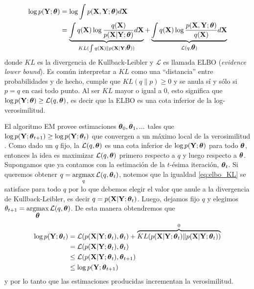 \begin{align}
    \log p(\mathbf{Y}; \mbox{\boldmath$ \theta $}) &=  \log \int p(\mathbf{X}, \mathbf{Y}; \mbox{\boldmath$ \theta $}) d\mathbf{X} \\
    &=  \underbrace{\int q(\mathbf{X}) \log \frac{q(\mathbf{X})}{p(\mathbf{X} | \mathbf{Y}; \mbox{\boldmath$ \theta $})} d\mathbf{X}}_{KL(\int q(\mathbf{X}) \rVert p(\mathbf{X} | \mathbf{Y}; \mbox{\boldmath$ \theta $}))} + \underbrace{\int q(\mathbf{X}) \log \frac{p(\mathbf{X}, \mathbf{Y}; \mbox{\boldmath$ \theta $})}{q(\mathbf{X})} d\mathbf{X}}_{\mathcal{L}(q, \mbox{\boldmath$ \theta $})} \label{eq:elbo_KL}
\end{align}
donde $KL$ es la divergencia de Kullback-Leibler y $\mathcal{L}$ es llamada ELBO (\textit{evidence lower bound}). Es común interpretar a $KL$ como una ``distancia'' entre probabilidades y de hecho, cumple que $KL(q \rVert p) \geq 0$ y se anula sí y sólo si $p = q$ en casi todo punto. Al ser $KL$ mayor o igual a 0, esto significa que $\log p(\mathbf{Y}; \mbox{\boldmath$ \theta $}) \geq \mathcal{L}(q, \mbox{\boldmath$ \theta $})$, es decir que la ELBO es una cota inferior de la log-verosimilitud.  

El algoritmo EM provee estimaciones $\mbox{\boldmath$ \theta $}_0, \mbox{\boldmath$ \theta $}_1, ...$ tales que $\log p(\mathbf{Y}; \mbox{\boldmath$ \theta $}_{t+1}) \geq \log p(\mathbf{Y}; \mbox{\boldmath$ \theta $}_t)$ que convergen a un máximo local de la verosimilitud \citep{Wu1983}. Como dado un $q$ fijo, la $\mathcal{L}(q,\mbox{\boldmath$ \theta $})$ es una cota inferior de $\log p(\mathbf{Y}; \mbox{\boldmath$ \theta $})$ para todo $\mbox{\boldmath$ \theta $}$, entonces la idea es maximizar $\mathcal{L}(q,\mbox{\boldmath$ \theta $})$ primero respecto a $q$ y luego respecto a $\mbox{\boldmath$ \theta $}$. Supongamos que ya contamos con la estimación de la $t$-ésima iteración, $\mbox{\boldmath$ \theta $}_t$. Si queremos obtener $q = \operatorname*{argmax}\limits_{q}\mathcal{L}(q,\mbox{\boldmath$ \theta $}_t)$, notemos que la igualdad \ref{eq:elbo_KL} se satisface para todo $q$ por lo que debemos elegir el valor que anule a la divergencia de Kullback-Leibler, es decir $q = p(\mathbf{X} | \mathbf{Y}; \mbox{\boldmath$ \theta $}_t)$. Luego, dejamos fijo $q$ y elegimos $\theta_{t+1} = \operatorname*{argmax}\limits_{\mbox{\boldmath$ \theta $}} \mathcal{L}(q,\mbox{\boldmath$ \theta $})$. De esta manera obtendremos que 
\begin{align*}
    \log p(\mathbf{Y}; \mbox{\boldmath$ \theta $}_t) &= \mathcal{L}(p(\mathbf{X} | \mathbf{Y}; \mbox{\boldmath$ \theta $}_t), \mbox{\boldmath$ \theta $}_t) + \overbrace{KL(p(\mathbf{X} | \mathbf{Y}; \mbox{\boldmath$ \theta $}_t) \rVert p(\mathbf{X} | \mathbf{Y}; \mbox{\boldmath$ \theta $}_t))}^{0} \\
    &= \mathcal{L}(p(\mathbf{X} | \mathbf{Y}; \mbox{\boldmath$ \theta $}_t), \mbox{\boldmath$ \theta $}_t) \\
    &\leq \mathcal{L}(p(\mathbf{X} | \mathbf{Y}; \mbox{\boldmath$ \theta $}_t), \mbox{\boldmath$ \theta $}_{t+1}) \\
    &\leq \log p(\mathbf{Y}; \mbox{\boldmath$ \theta $}_{t+1})
\end{align*}
y por lo tanto que las estimaciones producidas incrementan la verosimilitud.

